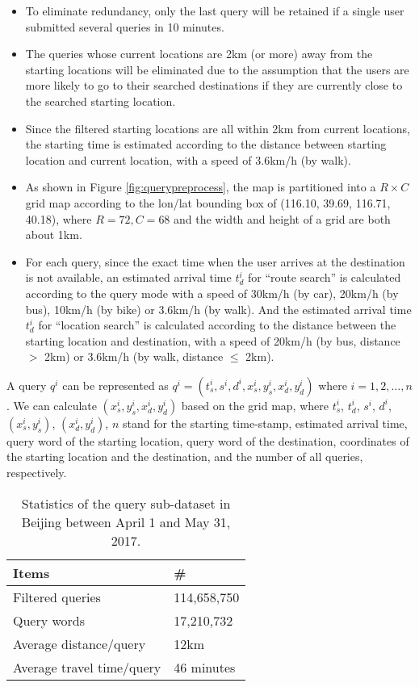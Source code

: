 \begin{itemize}
\item To eliminate redundancy, only the last query will be retained if a single user submitted several queries in 10 minutes.
\item  The queries whose current locations are 2km (or more) away from the starting locations will be eliminated due to the assumption that the users are more likely to go to their searched destinations if they are currently close to the searched starting location.
\item Since the filtered starting locations are all within 2km from current locations, the starting time is estimated according to the distance between starting location and current location, with a speed of 3.6km/h (by walk).
\item As shown in Figure \ref{fig:querypreprocess}, the map is partitioned into a $R \times C$ grid map according to the lon/lat bounding box of  (116.10, 39.69, 116.71, 40.18), where $R=72, C=68$ and the width and height of a grid are both about 1km.
\item For each query, since the exact time when the user arrives at the destination is not available, an estimated arrival time $t_d^i$ for ``route search'' is calculated according to the query mode with a speed of 30km/h (by car), 20km/h (by bus), 10km/h (by bike) or 3.6km/h (by walk). And the estimated arrival time $t_d^i$ for ``location search'' is calculated according to the distance between the starting location and destination, with a speed of 20km/h (by bus, distance $>$ 2km) or 3.6km/h (by walk, distance $\leq$ 2km).
\end{itemize}

A query $q^i$ can be represented as $q^i= (t_s^i, s^i, d^i, x_s^i, y_s^i, x_d^i, y_d^i)$ where $i=1, 2, \dots, n$. We can calculate $(x_s^i, y_s^i, x_d^i, y_d^i)$ based on the grid map, where $t_s^i$, $t_d^i$, $s^i$, $d^i$, $(x_s^i, y_s^i)$, $(x_d^i, y_d^i)$, $n$ stand for the starting time-stamp, estimated arrival time, query word of the starting location, query word of the destination, coordinates of the starting location and the destination, and the number of all queries, respectively. 

\begin{table}[htbp]
\centering
\caption{Statistics of the query sub-dataset in Beijing between April 1 and May 31, 2017.}
\label{tab:querystats}
\begin{tabular}{ll}
\toprule
Items & \#  \\
\midrule
Filtered queries & 114,658,750 \\
Query words & 17,210,732 \\
Average distance/query & 12km \\
Average travel time/query & 46 minutes \\
\bottomrule
\end{tabular}
\end{table}

